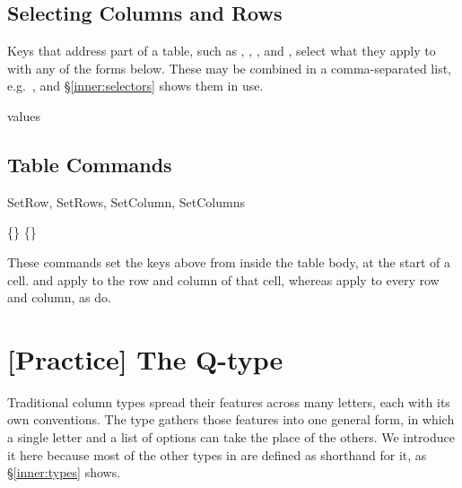 \subsection{Selecting Columns and Rows}\label{impatient:selectors}
\begin{codedescribe}{}
  Keys that address part of a table, such as , , ,  and , select what they apply to with any of the forms below. These may be combined in a comma-separated list, e.g.\ , and \S\ref{inner:selectors} shows them in use.
  \begin{describelist*}{values}
  \end{describelist*}
\end{codedescribe}

\subsection{Table Commands}\label{impatient:commands}
\begin{codedescribe}[code]{SetRow, SetRows, SetColumn, SetColumns}
  \begin{codesyntax}
    \{\} 
    \{\} 
  \end{codesyntax}
  These commands set the keys above from inside the table body, at the start of a cell.  and  apply to the row and column of that cell, whereas  apply to every row and column, as  do.
\end{codedescribe}

\section{[Practice] The Q-type}\label{impatient:qtype}
Traditional column types spread their features across many letters, each with its own conventions. The  type gathers those features into one general form, in which a single letter and a list of options can take the place of the others. We introduce it here because most of the other types in  are defined as shorthand for it, as \S\ref{inner:types} shows.

